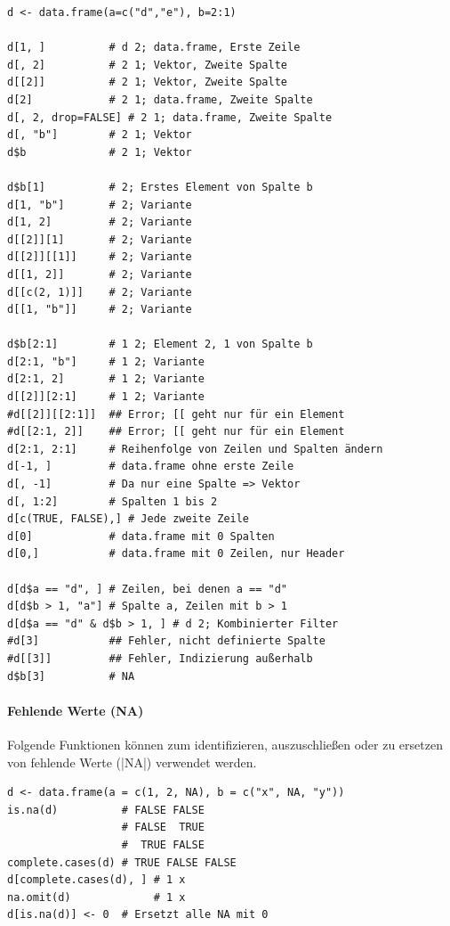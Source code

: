\documentclass[10pt,twocolumn]{scrartcl}
\renewcommand{\lstinline}{\mycoloredinline}
\begin{document}
\begin{lstlisting}
d <- data.frame(a=c("d","e"), b=2:1)

d[1, ]          # d 2; data.frame, Erste Zeile
d[, 2]          # 2 1; Vektor, Zweite Spalte
d[[2]]          # 2 1; Vektor, Zweite Spalte
d[2]            # 2 1; data.frame, Zweite Spalte
d[, 2, drop=FALSE] # 2 1; data.frame, Zweite Spalte
d[, "b"]        # 2 1; Vektor
d$b             # 2 1; Vektor

d$b[1]          # 2; Erstes Element von Spalte b
d[1, "b"]       # 2; Variante
d[1, 2]         # 2; Variante
d[[2]][1]       # 2; Variante
d[[2]][[1]]     # 2; Variante
d[[1, 2]]       # 2; Variante
d[[c(2, 1)]]    # 2; Variante
d[[1, "b"]]     # 2; Variante

d$b[2:1]        # 1 2; Element 2, 1 von Spalte b
d[2:1, "b"]     # 1 2; Variante
d[2:1, 2]       # 1 2; Variante
d[[2]][2:1]     # 1 2; Variante
#d[[2]][[2:1]]  ## Error; [[ geht nur für ein Element
#d[[2:1, 2]]    ## Error; [[ geht nur für ein Element
d[2:1, 2:1]     # Reihenfolge von Zeilen und Spalten ändern
d[-1, ]         # data.frame ohne erste Zeile
d[, -1]         # Da nur eine Spalte => Vektor
d[, 1:2]        # Spalten 1 bis 2
d[c(TRUE, FALSE),] # Jede zweite Zeile
d[0]            # data.frame mit 0 Spalten
d[0,]           # data.frame mit 0 Zeilen, nur Header

d[d$a == "d", ] # Zeilen, bei denen a == "d"
d[d$b > 1, "a"] # Spalte a, Zeilen mit b > 1
d[d$a == "d" & d$b > 1, ] # d 2; Kombinierter Filter
#d[3]           ## Fehler, nicht definierte Spalte
#d[[3]]         ## Fehler, Indizierung außerhalb
d$b[3]          # NA
\end{lstlisting}

\paragraph{Fehlende Werte (NA)}

Folgende Funktionen können zum identifizieren, auszuschließen oder zu ersetzen von fehlende Werte (\lstinline|NA|) verwendet werden.

\begin{lstlisting}
d <- data.frame(a = c(1, 2, NA), b = c("x", NA, "y"))
is.na(d)          # FALSE FALSE
                  # FALSE  TRUE
                  #  TRUE FALSE
complete.cases(d) # TRUE FALSE FALSE
d[complete.cases(d), ] # 1 x
na.omit(d)             # 1 x
d[is.na(d)] <- 0  # Ersetzt alle NA mit 0
\end{lstlisting}
\end{document}
